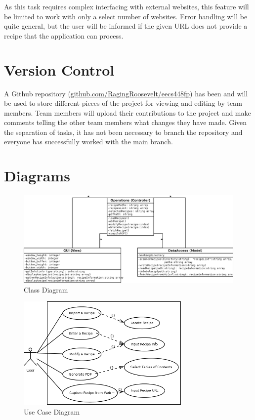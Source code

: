 \documentclass[landscape]{article}
\begin{document}
As this task requires complex interfacing with external websites, this feature will be limited to work with only a select number of websites. Error handling will be quite general, but the user will be informed if the given URL does not provide a recipe that the application can process.


\section{Version Control}

A Github repository (\href{https://github.com/RagingRoosevelt/eecs448fp}{github.com/RagingRoosevelt/eecs448fp}) has been and will be used to store different pieces of the project for viewing and editing by team members. Team members will upload their contributions to the project and make comments telling the other team members what changes they have made.  Given the separation of tasks, it has not been necessary to branch the repository and everyone has successfully worked with the main branch.

\newpage

\section{Diagrams}

\begin{figure}[H]
\begin{centering}
\includegraphics[width=\textwidth]{Diagram-Class.png}
\caption{Class Diagram}
\end{centering}
\end{figure}


\begin{figure}[H]
\begin{centering}
\includegraphics[width=0.75\textwidth]{Diagram-UseCase.png}
\caption{Use Case Diagram}
\end{centering}
\end{figure}
\end{document}
